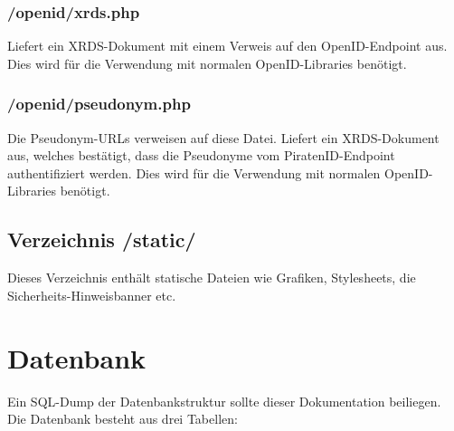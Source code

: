 \documentclass[parskip=half]{scrartcl}
\begin{document}
\subsubsection{/openid/xrds.php}
Liefert ein XRDS-Dokument mit einem Verweis auf den OpenID-Endpoint aus.
Dies wird für die Verwendung mit normalen OpenID-Libraries benötigt.

\subsubsection{/openid/pseudonym.php}
Die Pseudonym-URLs verweisen auf diese Datei.
Liefert ein XRDS-Dokument aus, welches bestätigt, dass die Pseudonyme vom PiratenID-Endpoint authentifiziert werden.
Dies wird für die Verwendung mit normalen OpenID-Libraries benötigt.


\subsection{Verzeichnis /static/}
Dieses Verzeichnis enthält statische Dateien wie Grafiken, Stylesheets, die Sicherheits-Hinweisbanner etc.


\section{Datenbank}
Ein SQL-Dump der Datenbankstruktur sollte dieser Dokumentation beiliegen.
Die Datenbank besteht aus drei Tabellen:
\end{document}
